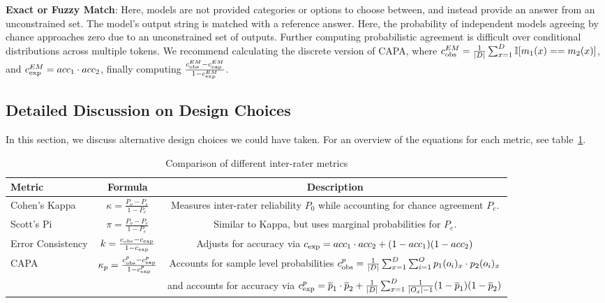 \textbf{Exact or Fuzzy Match}: Here, models are not provided categories or options to choose between, and instead provide an answer from an unconstrained set. The model's output string is matched with a reference answer. Here, the probability of independent models agreeing by chance approaches zero due to an unconstrained set of outputs. Further computing probabilistic agreement is difficult over conditional distributions across multiple tokens. We recommend calculating the discrete version of CAPA, where $c_{\text{obs}}^{EM} = \frac{1}{|D|} \sum_{x=1}^D \mathbb{I}[m_1(x) == m_2(x)]$, and $c_{\text{exp}}^{EM} = acc_1 \cdot acc_2$, finally computing $\frac{c_{\text{obs}}^{EM} - c_{\text{exp}}^{EM}}{1 - c_{\text{exp}}^{EM}}$. 

\subsection{Detailed Discussion on Design Choices}
\label{sec:app_metric_alternatives}

In this section, we discuss alternative design choices we could have taken. For an overview of the equations for each metric, see table~\ref{tab:kappa_pi}.

\begin{table}
    \centering
    \begin{tabular}{l c c}
        \toprule
        \textbf{Metric} & \textbf{Formula} & \textbf{Description} \\
        \midrule
        Cohen's Kappa & $\kappa = \frac{P_o - P_e}{1 - P_e}$ & Measures inter-rater reliability $P_0$ while accounting for chance agreement $P_e$. \\[10pt]
        Scott's Pi & $\pi = \frac{P_o - P_e}{1 - P_e}$ & Similar to Kappa, but uses marginal probabilities for $P_e$. \\
        Error Consistency &  $k = \frac{c_{\text{obs}} - c_{\text{exp}}}{1 - c_{\text{exp}}}$ & Adjusts for accuracy via $c_{\text{exp}} = acc_1 \cdot acc_2 + (1-acc_1)(1-acc_2)$ \\ 
        CAPA & $\kappa_{p} = \frac{c_{\text{obs}}^{p} - c_{\text{exp}}^{p}}{1 - c_{\text{exp}}^{p}}$ & Accounts for sample level probabilities $c_{\text{obs}}^{p} = \frac{1}{|D|}\sum^D_{x=1} \sum^{O}_{i=1}p_1(o_i)_x\cdot p_2(o_i)_x$\\ 
        & & and accounts for accuracy via $c_{\text{exp}}^{p} = \overline{p}_1 \cdot \overline{p}_2 + \frac{1}{|D|}\sum^{D}_{x=1}\frac{1}{|O_x|-1}(1-\overline{p}_1)(1-\overline{p}_2)$ \\
        \bottomrule
    \end{tabular}
    \caption{Comparison of different inter-rater metrics}
    \label{tab:kappa_pi}
\end{table}


